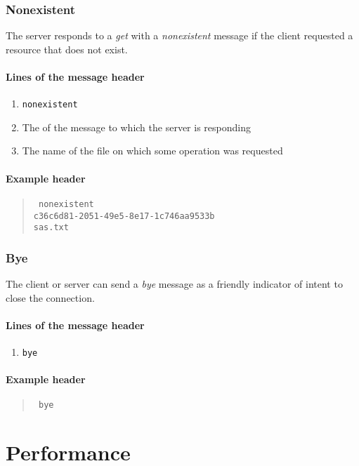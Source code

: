\documentclass[10pt]{article}
\begin{document}
\subsubsection{Nonexistent}

The server responds to a \textit{get} with a \textit{nonexistent} message
if the client requested a resource that does not exist.

\paragraph{Lines of the message header}
\begin{enumerate}
\item \texttt{nonexistent}
\item The  of the message to which the server is responding
\item The name of the file on which some operation was requested
\end{enumerate}

\paragraph{Example header}
\begin{quote}
\texttt{%
nonexistent \\
c36c6d81-2051-49e5-8e17-1c746aa9533b \\
sas.txt
}
\end{quote}

\subsubsection{Bye}

The client or server can send a \textit{bye} message as a friendly indicator
of intent to close the connection.

\paragraph{Lines of the message header}
\begin{enumerate}
\item \texttt{bye}
\end{enumerate}

\paragraph{Example header}
\begin{quote}
\texttt{%
bye
}
\end{quote}

\section{Performance}
\end{document}
